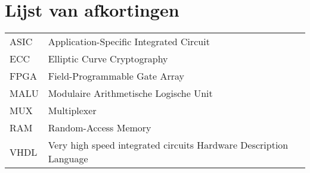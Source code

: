 \chapter*{Lijst van afkortingen}

\begin{tabular}{l@{$\qquad$}l}
ASIC	& Application-Specific Integrated Circuit\\
ECC	& Elliptic Curve Cryptography\\
FPGA	& Field-Programmable Gate Array\\
MALU	& Modulaire Arithmetische Logische Unit\\
MUX	& Multiplexer\\
RAM	& Random-Access Memory\\
VHDL	& Very high speed integrated circuits Hardware Description Language\\
\end{tabular}
